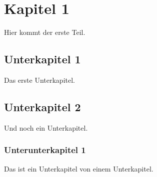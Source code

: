 \documentclass[a4paper, pdftex, 12pt, ngerman]{article}
\begin{document}
\tableofcontents
\section{Kapitel 1}
Hier kommt der erste Teil.
\subsection{Unterkapitel 1}
Das erste Unterkapitel.
\subsection{Unterkapitel 2}
Und noch ein Unterkapitel.
\subsubsection{Unterunterkapitel 1}
Das ist ein Unterkapitel von einem Unterkapitel.
\end{document}
